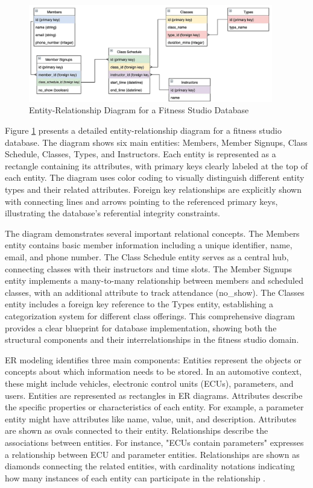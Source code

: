 \begin{figure}[ht]
    \centering
    \includegraphics[width=0.95\textwidth]{figures/er_diagram.png}
    \caption{Entity-Relationship Diagram for a Fitness Studio Database}
    \label{fig:er-diagram}
\end{figure}

Figure \ref{fig:er-diagram} presents a detailed entity-relationship diagram for a fitness studio database. The diagram shows six main entities: Members, Member Signups, Class Schedule, Classes, Types, and Instructors. Each entity is represented as a rectangle containing its attributes, with primary keys clearly labeled at the top of each entity. The diagram uses color coding to visually distinguish different entity types and their related attributes. Foreign key relationships are explicitly shown with connecting lines and arrows pointing to the referenced primary keys, illustrating the database's referential integrity constraints.

The diagram demonstrates several important relational concepts. The Members entity contains basic member information including a unique identifier, name, email, and phone number. The Class Schedule entity serves as a central hub, connecting classes with their instructors and time slots. The Member Signups entity implements a many-to-many relationship between members and scheduled classes, with an additional attribute to track attendance (no\_show). The Classes entity includes a foreign key reference to the Types entity, establishing a categorization system for different class offerings. This comprehensive diagram provides a clear blueprint for database implementation, showing both the structural components and their interrelationships in the fitness studio domain.

ER modeling identifies three main components: Entities represent the objects or concepts about which information needs to be stored. In an automotive context, these might include vehicles, electronic control units (ECUs), parameters, and users. Entities are represented as rectangles in ER diagrams. Attributes describe the specific properties or characteristics of each entity. For example, a parameter entity might have attributes like name, value, unit, and description. Attributes are shown as ovals connected to their entity. Relationships describe the associations between entities. For instance, "ECUs contain parameters" expresses a relationship between \ac{ECU} and parameter entities. Relationships are shown as diamonds connecting the related entities, with cardinality notations indicating how many instances of each entity can participate in the relationship \cite{elmasri2015fundamentals}.

